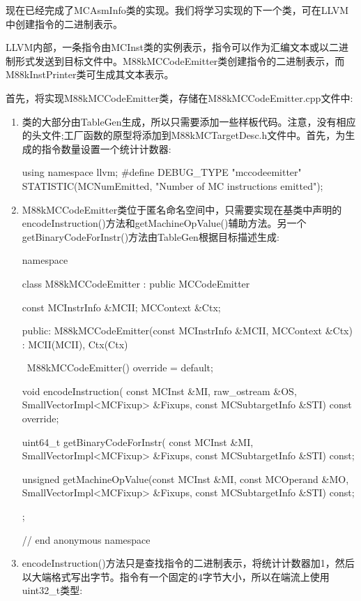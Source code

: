 现在已经完成了MCAsmInfo类的实现。我们将学习实现的下一个类，可在LLVM中创建指令的二进制表示。


LLVM内部，一条指令由MCInst类的实例表示，指令可以作为汇编文本或以二进制形式发送到目标文件中。M88kMCCodeEmitter类创建指令的二进制表示，而M88kInstPrinter类可生成其文本表示。

首先，将实现M88kMCCodeEmitter类，存储在M88kMCCodeEmitter.cpp文件中:

\begin{enumerate}
\item
类的大部分由TableGen生成，所以只需要添加一些样板代码。注意，没有相应的头文件;工厂函数的原型将添加到M88kMCTargetDesc.h文件中。首先，为生成的指令数量设置一个统计计数器:

\begin{cpp}
using namespace llvm;
#define DEBUG_TYPE "mccodeemitter"
STATISTIC(MCNumEmitted,
          "Number of MC instructions emitted");
\end{cpp}

\item
M88kMCCodeEmitter类位于匿名命名空间中，只需要实现在基类中声明的encodeInstruction()方法和getMachineOpValue()辅助方法。另一个getBinaryCodeForInstr()方法由TableGen根据目标描述生成:

\begin{cpp}
namespace {
class M88kMCCodeEmitter : public MCCodeEmitter {
    const MCInstrInfo &MCII;
    MCContext &Ctx;

public:
    M88kMCCodeEmitter(const MCInstrInfo &MCII,
                      MCContext &Ctx)
    : MCII(MCII), Ctx(Ctx) {}

    ~M88kMCCodeEmitter() override = default;

    void encodeInstruction(
        const MCInst &MI, raw_ostream &OS,
        SmallVectorImpl<MCFixup> &Fixups,
        const MCSubtargetInfo &STI) const override;

    uint64_t getBinaryCodeForInstr(
        const MCInst &MI,
        SmallVectorImpl<MCFixup> &Fixups,
        const MCSubtargetInfo &STI) const;

    unsigned
    getMachineOpValue(const MCInst &MI,
                        const MCOperand &MO,
                        SmallVectorImpl<MCFixup> &Fixups,
                        const MCSubtargetInfo &STI) const;
};
} // end anonymous namespace
\end{cpp}

\item
encodeInstruction()方法只是查找指令的二进制表示，将统计计数器加1，然后以大端格式写出字节。指令有一个固定的4字节大小，所以在端流上使用uint32\_t类型:


\end{enumerate}

